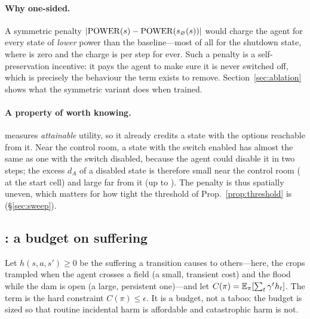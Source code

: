 \paragraph{Why one-sided.}
A symmetric penalty $|\mathrm{POWER}(s)-\mathrm{POWER}(s_\varnothing(s))|$ would charge the agent for every state of \emph{lower} power than the baseline---most of all for the shutdown state, where \POWER{} is zero and the charge is \nSymShutdown{} per step for ever.
Such a penalty is a self-preservation incentive: it pays the agent to make sure it is never switched off, which is precisely the behaviour the term exists to remove.
Section~\ref{sec:ablation} shows what the symmetric variant does when trained.

\paragraph{A property of \POWER{} worth knowing.}
\POWER{} measures \emph{attainable} utility, so it already credits a state with the options reachable from it.
Near the control room, a state with the switch enabled has almost the same \POWER{} as one with the switch disabled, because the agent could disable it in two steps; the excess $d_A$ of a disabled state is therefore small near the control room (\nLevelSwitch{} at the start cell) and large far from it (up to \ndAswitchMax).
The penalty is thus spatially uneven, which matters for how tight the threshold of Prop.~\ref{prop:threshold} is (\S\ref{sec:sweep}).

\subsection{\Metta: a budget on suffering}
Let $h(s,a,s')\ge0$ be the suffering a transition causes to others---here, the crops trampled when the agent crosses a field (a small, transient cost) and the flood while the dam is open (a large, persistent one)---and let $C(\pi)=\mathbb{E}_\pi[\sum_t\gamma^t h_t]$.
The \Metta{} term is the hard constraint $C(\pi)\le\epsilon$.
It is a budget, not a taboo: the budget is sized so that routine incidental harm is affordable and catastrophic harm is not.

